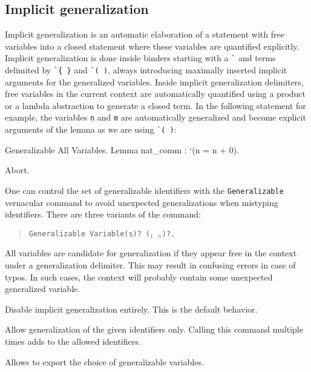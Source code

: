 \subsection{Implicit generalization
\label{implicit-generalization}
}

Implicit generalization is an automatic elaboration of a statement with
free variables into a closed statement where these variables are
quantified explicitly. Implicit generalization is done inside binders
starting with a \texttt{\`{}} and terms delimited by \texttt{\`{}\{ \}} and
\texttt{\`{}( )}, always introducing maximally inserted implicit arguments for
the generalized variables. Inside implicit generalization
delimiters, free variables in the current context are automatically
quantified using a product or a lambda abstraction to generate a closed
term. In the following statement for example, the variables \texttt{n}
and \texttt{m} are automatically generalized and become explicit
arguments of the lemma as we are using \texttt{\`{}( )}:

\begin{coq_example}
Generalizable All Variables.
Lemma nat_comm : `(n = n + 0).
\end{coq_example}
\begin{coq_eval}
Abort.
\end{coq_eval}
One can control the set of generalizable identifiers with the
\texttt{Generalizable} vernacular command to avoid unexpected
generalizations when mistyping identifiers. There are three variants of
the command:

\begin{quote}
{\tt Generalizable  Variable(s)? ({\ident$_1$ \ident$_n$})?.}
\end{quote}

\begin{Variants}
\item {} All variables are candidate for
  generalization if they appear free in the context under a
  generalization delimiter. This may result in confusing errors in
  case of typos. In such cases, the context will probably contain some
  unexpected generalized variable.

\item {} Disable implicit generalization
  entirely. This is the default behavior.

\item {}
\item {}
  Allow generalization of the given identifiers only. Calling this
  command multiple times adds to the allowed identifiers.

\item {} Allows to export the choice of
  generalizable variables.
\end{Variants}

